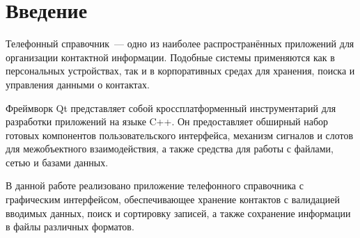 \section*{Введение}

Телефонный справочник~--- одно из наиболее распространённых приложений для организации контактной информации. Подобные системы применяются как в персональных устройствах, так и в корпоративных средах для хранения, поиска и управления данными о контактах.

Фреймворк Qt представляет собой кроссплатформенный инструментарий для разработки приложений на языке C++. Он предоставляет обширный набор готовых компонентов пользовательского интерфейса, механизм сигналов и слотов для межобъектного взаимодействия, а также средства для работы с файлами, сетью и базами данных.

В данной работе реализовано приложение телефонного справочника с графическим интерфейсом, обеспечивающее хранение контактов с валидацией вводимых данных, поиск и сортировку записей, а также сохранение информации в файлы различных форматов.